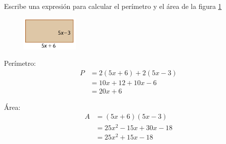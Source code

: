 Escribe una expresión para calcular el perímetro y el área de la figura \ref{fig:20230319044608}

\begin{figure}[H]
  \centering
  \includegraphics[width=0.25\textwidth]{../images/20230319044608}
  \caption{}
  \label{fig:20230319044608}
\end{figure}

\begin{solutionbox}{4cm}
  \begin{multicols}{2}
    Perímetro:
    \begin{align*}
      P & =2(5x+6)+2(5x-3) \\
        & =10x+12+10x-6    \\
        & =20x+6
    \end{align*}

    Área:
    \begin{align*}
      A & =(5x+6)(5x-3)     \\
        & =25x^2-15x+30x-18 \\
        & =25x^2+15x-18
    \end{align*}
  \end{multicols}
\end{solutionbox}